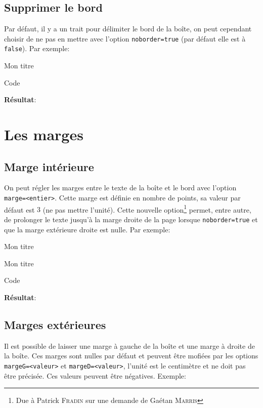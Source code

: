 \documentclass[a4paper,10pt,frenchb]{article}
\newenvironment*{demo}{%
\VerbatimOut{toto.txt}%
}%
{%
\endVerbatimOut%
\begin{bclogo}[margeG=1,logo=\bccrayon,couleurBarre=Gray,barre=wave,noborder]{Code}%
\begin{footnotesize}%
%
\end{footnotesize}%
\end{bclogo}%
\noindent\textbf{Résultat}:\par\smallskip
%
}%
\newcommand*\cmd{\color{Maroon}}%
\begin{document}
\subsection{Supprimer le bord}

Par défaut, il y a un trait pour délimiter le bord de la boîte, on
peut cependant choisir de ne pas en mettre avec l'option
{\cmd\verb|noborder=true|} (par défaut elle est à \texttt{false}). Par
exemple:

\begin{demo}
\begin{bclogo}[noborder=true,couleurBarre=DarkRed]{Mon
    titre}
  \lipsum[1]
\end{bclogo}
\end{demo}

\section{Les marges}

\subsection{Marge intérieure}

On peut régler les marges entre le texte de la boîte et le bord avec
l'option {\cmd\verb|marge=<entier>|}. Cette marge est définie en
nombre de points, sa valeur par défaut est $3$ (ne pas mettre
l'unité). Cette nouvelle option\footnote{Due à Patrick \textsc{Fradin}
  sur une demande de Gaétan \textsc{Marris}} permet, entre autre, de
prolonger le texte jusqu'à la marge droite de la page lorsque
{\cmd\verb|noborder=true|} et que la marge extérieure droite est
nulle. Par exemple:

\begin{demo}
\begin{bclogo}[logo=\bccrayon,noborder=true,marge=0]{Mon titre}%
\lipsum[2]
\end{bclogo}
\begin{bclogo}[logo=\bccrayon,marge=8]{Mon titre}%
\lipsum[2]
\end{bclogo}
\end{demo}

\subsection{Marges extérieures}

Il est possible de laisser une marge à gauche de la boîte et une marge
à droite de la boîte. Ces marges sont nulles par défaut et peuvent
être mofiées par les options {\cmd\verb|margeG=<valeur>|} et
{\cmd\verb|margeD=<valeur>|}, l'unité est le centimètre et ne doit pas
être précisée. Ces valeurs peuvent être négatives. Exemple:
\end{document}

